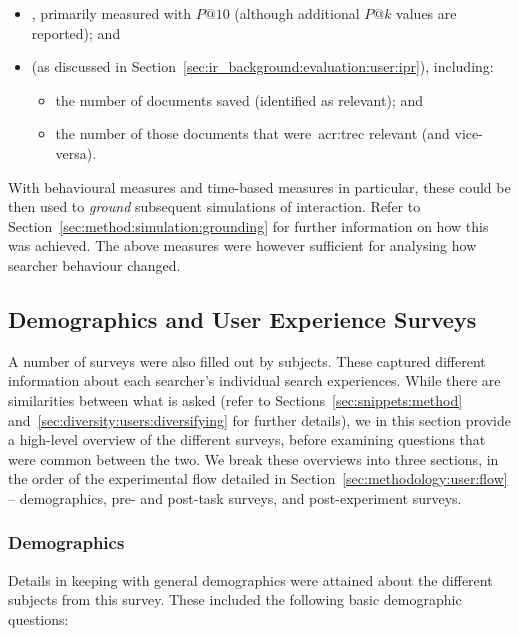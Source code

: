 \begin{itemize}
    \item{, primarily measured with $P@10$ (although additional $P@k$ values are reported); and}
    \item{ (as discussed in Section~\ref{sec:ir_background:evaluation:user:ipr}), including:}
    
    \begin{itemize}
        \item{the number of documents saved (identified as relevant); and}
        \item{the number of those documents that were~\gls{acr:trec} relevant (and vice-versa).}
    \end{itemize}
\end{itemize}

 With behavioural measures and time-based measures in particular, these could be then used to \emph{ground} subsequent simulations of interaction. Refer to Section~\ref{sec:method:simulation:grounding} for further information on how this was achieved. The above measures were however sufficient for analysing how searcher behaviour changed.

\subsection{Demographics and User Experience Surveys}\label{sec:methodology:extracting:user}
A number of surveys were also filled out by subjects. These captured different information about each searcher's individual search experiences. While there are similarities between what is asked (refer to Sections~\ref{sec:snippets:method} and~\ref{sec:diversity:users:diversifying} for further details), we in this section provide a high-level overview of the different surveys, before examining questions that were common between the two. We break these overviews into three sections, in the order of the experimental flow detailed in Section~\ref{sec:methodology:user:flow} -- demographics, pre- and post-task surveys, and post-experiment surveys.

\subsubsection{Demographics}
Details in keeping with general demographics were attained about the different subjects from this survey. These included the following basic demographic questions:

